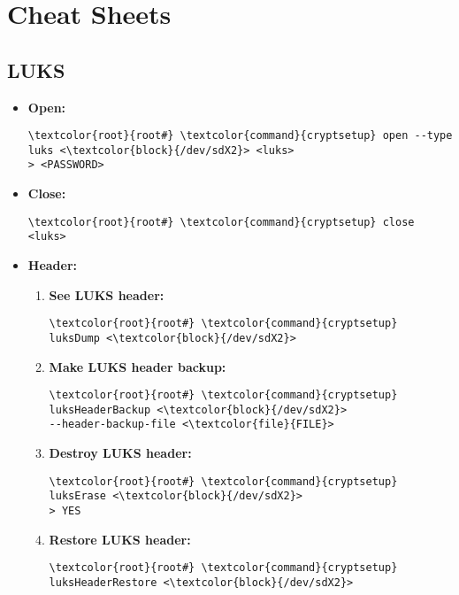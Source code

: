 \documentclass[10pt, a4paper, onecolumn, oneside, titlepage, openany]{book}
\begin{document}
\chapter{Cheat Sheets}
\section{LUKS}
\label{cheatsheet_luks}
\begin{itemize}
    \item \textbf{Open:}
\begin{Verbatim}[commandchars=\\\{\}]
\textcolor{root}{root#} \textcolor{command}{cryptsetup} open --type luks <\textcolor{block}{/dev/sdX2}> <luks>
> <PASSWORD>
\end{Verbatim}
    \item \textbf{Close:}
\begin{Verbatim}[commandchars=\\\{\}]
\textcolor{root}{root#} \textcolor{command}{cryptsetup} close <luks>
\end{Verbatim}
    \item \textbf{Header:}
    \begin{enumerate}
        \item \textbf{See LUKS header:}
\begin{Verbatim}[commandchars=\\\{\}]
\textcolor{root}{root#} \textcolor{command}{cryptsetup} luksDump <\textcolor{block}{/dev/sdX2}>
\end{Verbatim}
        \item \textbf{Make LUKS header backup:}
\begin{Verbatim}[commandchars=\\\{\}]
\textcolor{root}{root#} \textcolor{command}{cryptsetup} luksHeaderBackup <\textcolor{block}{/dev/sdX2}>
--header-backup-file <\textcolor{file}{FILE}>
\end{Verbatim}
        \item \textbf{Destroy LUKS header:}
\begin{Verbatim}[commandchars=\\\{\}]
\textcolor{root}{root#} \textcolor{command}{cryptsetup} luksErase <\textcolor{block}{/dev/sdX2}>
> YES
\end{Verbatim}
        \item \textbf{Restore LUKS header:}
\begin{Verbatim}[commandchars=\\\{\}]
\textcolor{root}{root#} \textcolor{command}{cryptsetup} luksHeaderRestore <\textcolor{block}{/dev/sdX2}>

\end{Verbatim}
\end{enumerate}
\end{itemize}
\end{document}
